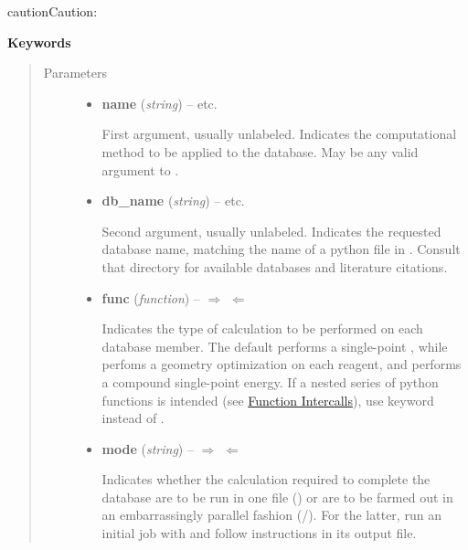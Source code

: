 \documentclass[letterpaper,10pt,english]{sphinxmanual}
\begin{document}
\begin{fulllineitems}
\begin{notice}{caution}{Caution:}
\begin{itemize}
\end{itemize}
\end{notice}

\textbf{Keywords}
\begin{quote}\begin{description}
\item[{Parameters}] \leavevmode\begin{itemize}
\item {} 
\textbf{name} (\emph{string}) -- 
 \textbar{}\textbar{}  \textbar{}\textbar{}  \textbar{}\textbar{} etc.

First argument, usually unlabeled. Indicates the computational method
to be applied to the database. May be any valid argument to
{\hyperref[index:driver.energy]{}}.


\item {} 
\textbf{db\_name} (\emph{string}) -- 
 \textbar{}\textbar{}  \textbar{}\textbar{}  \textbar{}\textbar{} etc.

Second argument, usually unlabeled. Indicates the requested database
name, matching the name of a python file in .
Consult that directory for available databases and literature citations.


\item {} 
\textbf{func} (\emph{function}) -- 
$\Rightarrow$  $\Leftarrow$ \textbar{}\textbar{}  \textbar{}\textbar{} 

Indicates the type of calculation to be performed on each database
member. The default performs a single-point , while
 perfoms a geometry optimization on each reagent, and
 performs a compound single-point energy. If a nested series
of python functions is intended (see {\hyperref[index:function-intercalls]{Function Intercalls}}), use
keyword  instead of .


\item {} 
\textbf{mode} (\emph{string}) -- 
$\Rightarrow$  $\Leftarrow$ \textbar{}\textbar{}  \textbar{}\textbar{} 

Indicates whether the calculation required to complete the
database are to be run in one file () or are to be
farmed out in an embarrassingly parallel fashion
(/).  For the latter, run an initial job with
 and follow instructions in its output file.



\end{itemize}
\end{description}
\end{quote}
\end{fulllineitems}
\end{document}
